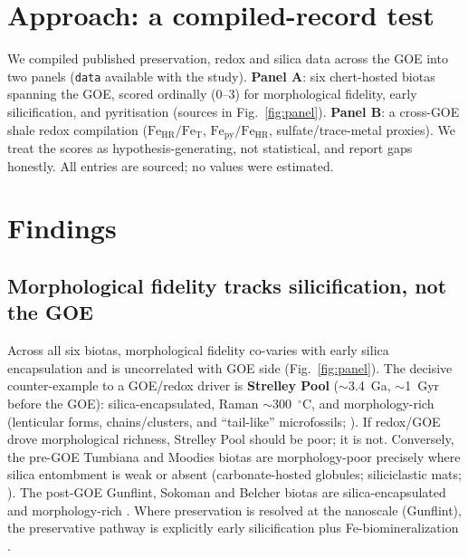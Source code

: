 \documentclass[11pt]{article}
\begin{document}
\section{Approach: a compiled-record test}

We compiled published preservation, redox and silica data across the GOE into two panels
(\texttt{data} available with the study). \textbf{Panel A}: six chert-hosted biotas spanning the
GOE, scored ordinally (0--3) for morphological fidelity, early silicification, and pyritisation
(sources in Fig.~\ref{fig:panel}). \textbf{Panel B}: a cross-GOE shale redox compilation
(\(\mathrm{Fe_{HR}}/\mathrm{Fe_T}\), \(\mathrm{Fe_{py}}/\mathrm{Fe_{HR}}\), sulfate/trace-metal
proxies). We treat the scores as hypothesis-generating, not statistical, and report gaps honestly.
All entries are sourced; no values were estimated.

\section{Findings}

\subsection{Morphological fidelity tracks silicification, not the GOE}

Across all six biotas, morphological fidelity co-varies with early silica encapsulation and is
uncorrelated with GOE side (Fig.~\ref{fig:panel}). The decisive counter-example to a GOE/redox
driver is \textbf{Strelley Pool} ($\sim$3.4~Ga, $\sim$1~Gyr before the GOE): silica-encapsulated,
Raman $\sim$300~$^\circ$C, and morphology-rich (lenticular forms, chains/clusters, and
``tail-like'' microfossils; \citealp{Delarue2020,Delarue2021,Sugitani2010}). If redox/GOE drove
morphological richness, Strelley Pool should be poor; it is not. Conversely, the pre-GOE Tumbiana
and Moodies biotas are morphology-poor precisely where silica entombment is weak or absent
(carbonate-hosted globules; siliciclastic mats; \citealp{Lepot2009,Homann2015,Decreane2021}). The
post-GOE Gunflint, Sokoman and Belcher biotas are silica-encapsulated and morphology-rich
\citep{Lepot2017,Hodgskiss2020}. Where preservation is resolved at the nanoscale (Gunflint), the
preservative pathway is explicitly early silicification plus Fe-biomineralization
\citep{Lepot2017,Alleon2016}.
\end{document}
